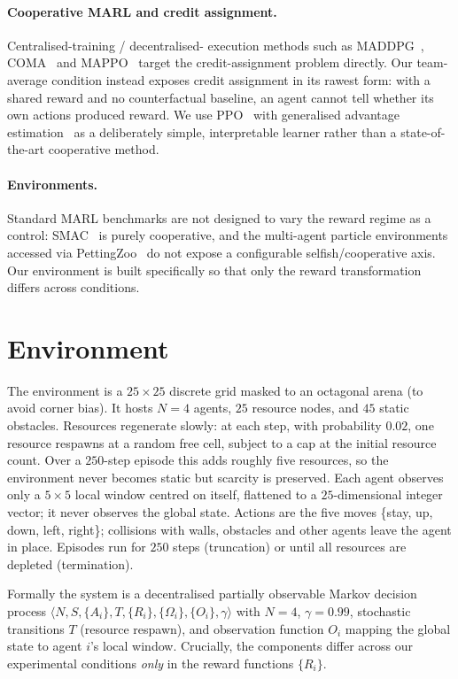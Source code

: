 \documentclass[sigconf,nonacm,anonymous,review]{acmart}
\begin{document}
\paragraph{Cooperative MARL and credit assignment.} Centralised-training / decentralised-
execution methods such as MADDPG~\cite{lowe2017maddpg}, COMA~\cite{foerster2018coma} and
MAPPO~\cite{yu2022mappo} target the credit-assignment problem directly. Our team-average
condition instead exposes credit assignment in its rawest form: with a shared reward and no
counterfactual baseline, an agent cannot tell whether its own actions produced reward. We use
PPO~\cite{schulman2017ppo} with generalised advantage estimation~\cite{schulman2016gae} as a
deliberately simple, interpretable learner rather than a state-of-the-art cooperative method.

\paragraph{Environments.} Standard MARL benchmarks are not designed to vary the reward regime
as a control: SMAC~\cite{samvelyan2019smac} is purely cooperative, and the multi-agent
particle environments accessed via PettingZoo~\cite{terry2021pettingzoo} do not expose a
configurable selfish/cooperative axis. Our environment is built specifically so that only the
reward transformation differs across conditions.

\section{Environment}
\label{sec:env}
The environment is a $25\times25$ discrete grid masked to an octagonal arena (to avoid corner
bias). It hosts $N=4$ agents, $25$ resource nodes, and $45$ static obstacles. Resources
regenerate slowly: at each step, with probability $0.02$, one resource respawns at a random
free cell, subject to a cap at the initial resource count. Over a $250$-step episode this adds
roughly five resources, so the environment never becomes static but scarcity is preserved. Each agent observes only a $5\times5$
local window centred on itself, flattened to a $25$-dimensional integer vector; it never
observes the global state. Actions are the five moves \{stay, up, down, left, right\};
collisions with walls, obstacles and other agents leave the agent in place. Episodes run for
$250$ steps (truncation) or until all resources are depleted (termination).

Formally the system is a decentralised partially observable Markov decision process
$\langle N, S, \{A_i\}, T, \{R_i\}, \{\Omega_i\}, \{O_i\}, \gamma\rangle$ with $N=4$,
$\gamma=0.99$, stochastic transitions $T$ (resource respawn), and observation function $O_i$
mapping the global state to agent $i$'s local window. Crucially, the components differ across
our experimental conditions \emph{only} in the reward functions $\{R_i\}$.
\end{document}

